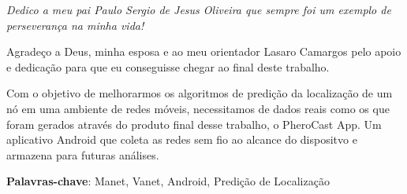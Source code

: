 \documentclass[12pt, %
openright, 
oneside,
a4paper,
brazil]{facom-ufu-abntex2}
\begin{document}
\begin{dedicatoria}
   \vspace*{\fill}
   \centering
   \noindent
   \textit{Dedico a meu pai Paulo Sergio de Jesus Oliveira que sempre foi um exemplo de perseverança na minha vida!}  %
   \vspace*{\fill}
\end{dedicatoria}

\begin{agradecimentos}
Agradeço a Deus, minha esposa e ao meu orientador Lasaro Camargos pelo apoio e dedicação para que eu conseguisse chegar ao final deste trabalho. %
\end{agradecimentos}




\begin{resumo} %
Com o objetivo de melhorarmos os algoritmos de predição da localização de um nó em uma ambiente de redes móveis, necessitamos de dados reais como os que foram gerados através do produto final desse trabalho, o PheroCast App. Um aplicativo Android que coleta as redes sem fio ao alcance do dispositvo e armazena para futuras análises.
 \vspace{\onelineskip}
    
 \noindent
 \textbf{Palavras-chave}: Manet, Vanet, Android, Predição de Localização%
\end{resumo}

\listoffigures*
\cleardoublepage

\listoftables*
\cleardoublepage



\end{document}

